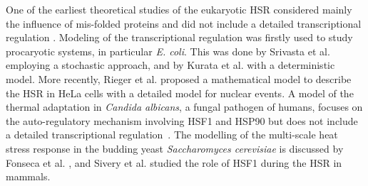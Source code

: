 \documentclass[oneside, 10pt, a4paper, twocolumn]{article}
\begin{document}
One of the earliest theoretical studies of the eukaryotic HSR considered mainly the influence of mis-folded proteins and did not include a detailed transcriptional regulation \cite{Peper1998}. 
Modeling of the transcriptional regulation was firstly used to study procaryotic
systems, in particular \emph{E. coli}.
This was done by Srivasta et al. \cite{Srivastava2001} employing a stochastic approach, and by Kurata et al. \cite{Kurata2001} with a deterministic model. 
More recently, Rieger et al. \cite{Rieger2005} %
proposed a mathematical model to describe the HSR in HeLa cells with a detailed model for nuclear events. 
A %
model of the thermal adaptation in \emph{Candida albicans}, a fungal pathogen of humans, focuses on the auto-regulatory mechanism involving HSF1 and HSP90 %
but does not include a detailed transcriptional regulation~\cite{Leach2012model, Leach2012description}. 
The modelling of the multi-scale heat stress response in the budding yeast \emph{Saccharomyces cerevisiae} is discussed by Fonseca et al. \cite{Fonseca2012}, and Sivery et al. \cite{Sivery2015} studied the role of HSF1 during the HSR in mammals. 


\end{document}
